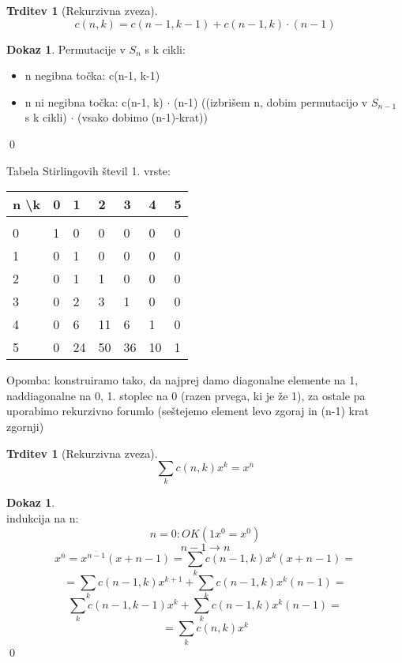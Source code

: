 \documentclass[a4paper,12pt]{article}
\theoremstyle{definition}
\newtheorem{claim}[counter]{Trditev}
\newtheorem{pro}[counter]{Dokaz}
\theoremstyle{remark}
\begin{document}
\begin{claim}[Rekurzivna zveza]
\[c(n, k) = c(n-1, k-1) + c(n-1, k)\cdot(n-1)\]
\end{claim}

\begin{pro}
Permutacije v $S_n$ s k cikli:
\begin{itemize}
    \item n negibna točka: c(n-1, k-1)
    \item n ni negibna točka: c(n-1, k)  $\cdot$ (n-1) ((izbrišem n, dobim permutacijo v $S_{n-1}$ s k cikli) $\cdot$ (vsako dobimo (n-1)-krat))
\end{itemize}
\qed
\end{pro}



Tabela Stirlingovih števil 1. vrste: \\

\begin{tabular}{l|llllll}
    n \textbackslash k & 0 & 1  & 2  & 3  & 4  & 5 \\
    \hline \\
    0 & 1 & 0  & 0  & 0  & 0  & 0 \\
    1 & 0 & 1  & 0  & 0  & 0  & 0 \\
    2 & 0 & 1  & 1  & 0  & 0  & 0 \\
    3 & 0 & 2  & 3  & 1  & 0  & 0 \\
    4 & 0 & 6  & 11 & 6  & 1  & 0 \\
    5 & 0 & 24 & 50 & 36 & 10 & 1
\end{tabular}

Opomba: konstruiramo tako, da najprej damo diagonalne elemente na 1, naddiagonalne na 0, 1. stoplec
na 0 (razen prvega, ki je že 1), za ostale pa uporabimo rekurzivno forumlo (seštejemo element levo
zgoraj in (n-1) krat zgornji)

\begin{claim}[Rekurzivna zveza]
    \[\sum_k c(n,k)x^k = x^{\overline{n}}\]
\end{claim}

\begin{pro}\mbox{}\\
    indukcija na n: \\
    \[n = 0: OK (1x^0 = x^0)\]
    \[n - 1 \rightarrow n\]
    \[x^{\overline{n}} = x^{\overline{n-1}}(x+n-1) = \sum_k c(n-1,k)x^k (x+n-1) =\]
    \[= \sum_k c(n-1,k)x^{k+1} + \sum_k c(n-1,k)x^k (n-1) = \]
    \[\sum_k c(n-1,k-1)x^{k} + \sum_k c(n-1,k)x^k (n-1) =\]
    \[= \sum_k c(n,k)x^k\]
    \qed
\end{pro}
\end{document}
